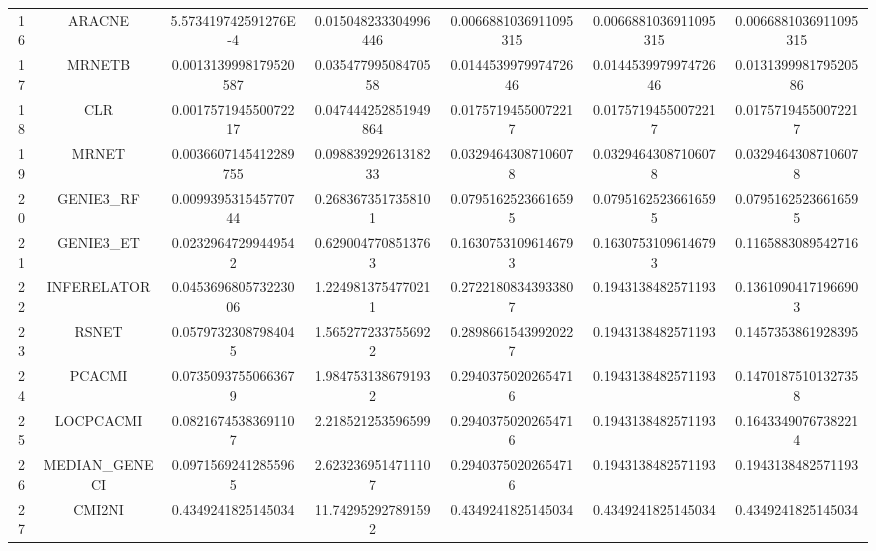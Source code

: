 \documentclass[a4paper,10pt]{article}
\begin{document}
\begin{landscape}
\begin{table}[!htp]
\begin{tabular}{ccccccc}
16&ARACNE&5.573419742591276E-4&0.015048233304996446&0.0066881036911095315&0.0066881036911095315&0.0066881036911095315\\
17&MRNETB&0.0013139998179520587&0.03547799508470558&0.014453997997472646&0.014453997997472646&0.013139998179520586\\
18&CLR&0.001757194550072217&0.047444252851949864&0.01757194550072217&0.01757194550072217&0.01757194550072217\\
19&MRNET&0.0036607145412289755&0.09883929261318233&0.03294643087106078&0.03294643087106078&0.03294643087106078\\
20&GENIE3_RF&0.009939531545770744&0.2683673517358101&0.07951625236616595&0.07951625236616595&0.07951625236616595\\
21&GENIE3_ET&0.02329647299449542&0.6290047708513763&0.16307531096146793&0.16307531096146793&0.1165883089542716\\
22&INFERELATOR&0.045369680573223006&1.2249813754770211&0.27221808343933807&0.1943138482571193&0.13610904171966903\\
23&RSNET&0.05797323087984045&1.5652772337556922&0.28986615439920227&0.1943138482571193&0.1457353861928395\\
24&PCACMI&0.07350937550663679&1.9847531386791932&0.29403750202654716&0.1943138482571193&0.14701875101327358\\
25&LOCPCACMI&0.08216745383691107&2.218521253596599&0.29403750202654716&0.1943138482571193&0.16433490767382214\\
26&MEDIAN_GENECI&0.09715692412855965&2.6232369514711107&0.29403750202654716&0.1943138482571193&0.1943138482571193\\
27&CMI2NI&0.4349241825145034&11.742952927891592&0.4349241825145034&0.4349241825145034&0.4349241825145034\\
\hline
\end{tabular}
\end{table}


\end{landscape}
\end{document}
